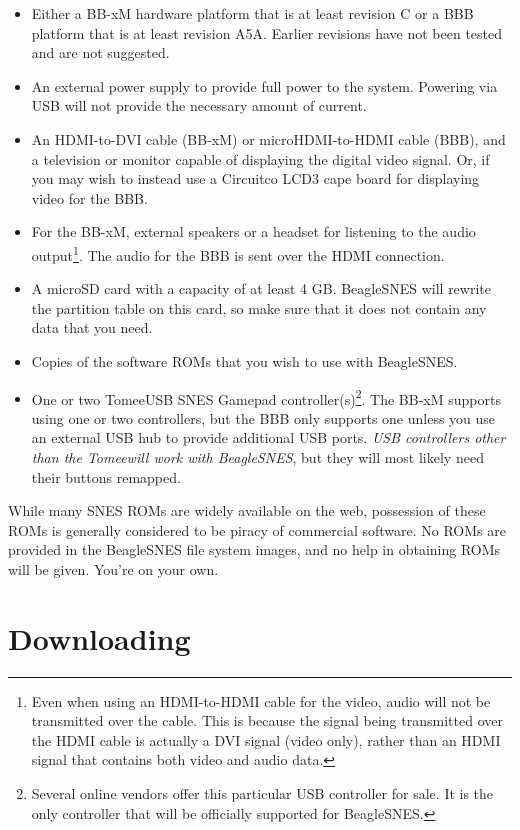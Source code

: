 \begin{itemize}
\item Either a BB-xM hardware platform that is at least revision C or a BBB platform that is at least revision A5A.  Earlier revisions have not been tested and are not suggested.
\item An external power supply to provide full power to the system.  Powering via USB will not provide the necessary amount of current.
\item An HDMI-to-DVI cable (BB-xM) or microHDMI-to-HDMI cable (BBB), and a television or monitor capable of displaying the digital video signal.  Or, if you may wish to instead use a Circuitco LCD3 cape board for displaying video for the BBB.
\item For the BB-xM, external speakers or a headset for listening to the audio output\footnote{Even when using an HDMI-to-HDMI cable for the video, audio will not be transmitted over the cable.  This is because the signal being transmitted over the HDMI cable is actually a DVI signal (video only), rather than an HDMI signal that contains both video and audio data.}.  The audio for the BBB is sent over the HDMI connection. 
\item A microSD card with a capacity of at least 4 GB.  BeagleSNES will rewrite the partition table on this card, so make sure that it does not contain any data that you need.
\item Copies of the software ROMs that you wish to use with BeagleSNES.
\item One or two Tomee\texttrademark USB SNES Gamepad controller(s)\footnote{Several online vendors offer this particular USB controller for sale. It is the only controller that will be officially supported for BeagleSNES.}. The BB-xM supports using one or two controllers, but the BBB only supports one unless you use an external USB hub to provide additional USB ports.  \emph{USB controllers other than the Tomee\texttrademark will work with BeagleSNES}, but they will most likely need their buttons remapped.
\end{itemize}

\begin{updateWarn}
While many SNES ROMs are widely available on the web, possession of these ROMs is generally considered to be piracy of commercial software. No ROMs are provided in the BeagleSNES file system images, and no help in obtaining ROMs will be given.  You're on your own.
\end{updateWarn}

\section{Downloading}

